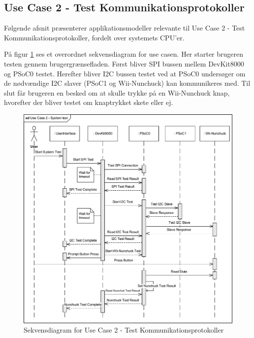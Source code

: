 \newpage
\subsection{Use Case 2 - Test Kommunikationsprotokoller}

Følgende afsnit præsenterer applikationsmodeller relevante til Use Case 2 - Test Kommunikationsprotokoller, fordelt over systemets CPU'er.

På figur \ref{fig:SystemTestOverviewSequenceDiagram} ses et overordnet sekvensdiagram for use casen. Her starter brugeren testen gennem brugergrænsefladen. Først bliver SPI bussen mellem DevKit8000 og PSoC0 testet. Herefter bliver I2C bussen testet ved at PSoC0 undersøger om de nødvændige I2C slaver (PSoC1 og Wii-Nunchuck) kan kommunikeres med. Til slut får brugeren en besked om at skulle trykke på en Wii-Nunchuck knap, hvorefter der bliver testet om knaptrykket skete eller ej.

\begin{figure}[H]
	\centering
	\includegraphics[width=\textwidth]{Systemarkitektur/images/SequenceDiagramUC2}
	\caption{Sekvensdiagram for Use Case 2 - Test Kommunikationsprotokoller}
	\label{fig:SystemTestOverviewSequenceDiagram}
\end{figure}

